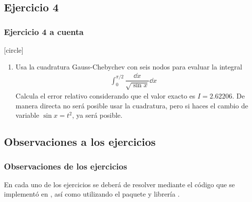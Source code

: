 \subsection*{Ejercicio 4}
\begin{frame}
\frametitle{Ejercicio 4 a cuenta}
[circle]
\begin{enumerate}[<+->]
\conti
\item Usa la cuadratura Gauss-Chebychev con seis nodos para evaluar la integral
\begin{align*}
\int_{0}^{\pi/2} \dfrac{\dd{x}}{\sqrt{\sin x}} \dd{x}
\end{align*}
Calcula el error relativo considerando que el valor exacto es $I=2.62206$. De manera directa no será posible usar la cuadratura, pero si haces el cambio de variable $\sin x = t^{2}$, ya será posible.
\end{enumerate}
\end{frame}
\subsection*{Observaciones a los ejercicios}
\begin{frame}
\frametitle{Observaciones de los ejercicios}
En cada uno de los ejercicios se deberá de resolver mediante el código que se implementó en \python, así como utilizando el paquete y librería .
\end{frame}	

